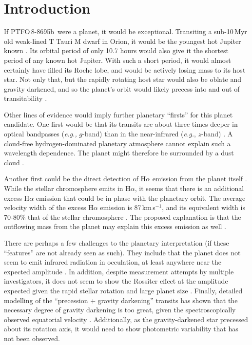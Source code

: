 \documentclass[12pt,twocolumn,tighten]{aastex62}
\newcommand{\ptfob}{PTFO$\,$8-8695b}
\begin{document}
\section{Introduction}
If \ptfob\ were a planet, it would be exceptional.  Transiting a
sub-10$\,$Myr old weak-lined T Tauri M dwarf in Orion, it would be the
youngest hot Jupiter known \citep{van_eyken_ptf_2012}.  Its orbital
period of only 10.7 hours would also give it the shortest period of
any known hot Jupiter.  With such a short period, it would almost
certainly have filled its Roche lobe, and would be actively losing
mass to its host star.  Not only that, but the rapidly rotating host
star would also be oblate and gravity darkened, and so the planet's
orbit would likely precess into and out of transitability
\citep{barnes_measurement_2013,ciardi_followup_2015,kamiaka_revisiting_2015}. 

Other lines of evidence would imply further planetary ``firsts'' for
this planet candidate.  One first would be that its transits are about
three times deeper in optical bandpasses ({\it e.g.,} $g$-band) than
in the near-infrared ({\it e.g.}, $z$-band)
\citep{onitsuka_multicolor_2017,tanimoto_evidence_2020}.  A cloud-free
hydrogen-dominated planetary atmosphere cannot explain such a
wavelength dependence.  The planet might therefore be surrounded by a
dust cloud \citep{tanimoto_evidence_2020}.  

Another first could be the direct detection of H$\alpha$ emission from
the planet itself \citep{johnskrull_h_2016}.  While the stellar
chromosphere emits in H$\alpha$, it seems that there is an additional
excess H$\alpha$ emission that could be in phase with the planetary
orbit.  The average velocity width of the excess H$\alpha$ emission is
87$\,$km$\,$s$^{-1}$, and its equivalent width is 70-80\% that of the
stellar chromosphere \citep{johnskrull_h_2016}.  The proposed
explanation is that the outflowing mass from the planet may explain
this excess emission as well \citep{johnskrull_h_2016}.

There are perhaps a few challenges to the planetary interpretation (if
these ``features'' are not already seen as such).  They include that
the planet does not seem to emit infrared radiation in occulation, at
least anywhere near the expected amplitude \citep{yu_tests_2015}.  In
addition, despite measurement attempts by multiple investigators, it
does not seem to show the Rossiter effect at the amplitude expected
given the rapid stellar rotation and large planet size
\citep{yu_tests_2015,ciardi_followup_2015}.  Finally, detailed
modelling of the ``precession + gravity darkening'' transits has shown
that the necessary degree of gravity darkening is too great, given the
spectroscopically observed equatorial velocity
\citep{howarth_reappraisal_2016}.  Additionally, as the
gravity-darkened star precessed about its rotation axis, it would need
to show photometric variability that has not been observed.
\end{document}
